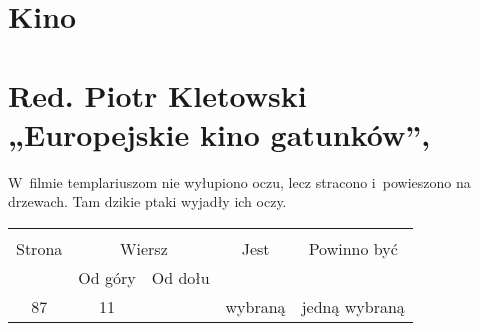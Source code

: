 \documentclass[a4paper,11pt]{article}
\numberwithin{equation}{section}
\begin{document}





























\newpage

\section{Kino}

\VerSpaceTwo



\section{ %
  Red. Piotr Kletowski \\
  „Europejskie kino gatunków”,
  \cite{RedKletowskiEuropejskieKinoGatunkow2016}}




 W~filmie templariuszom nie wyłupiono oczu, lecz
stracono i~powieszono na drzewach. Tam dzikie ptaki wyjadły ich oczy.







\begin{center}

  \begin{tabular}{|c|c|c|c|c|}
    \hline
    & \multicolumn{2}{c|}{} & & \\
    Strona & \multicolumn{2}{c|}{Wiersz} & Jest
                              & Powinno być \\ \cline{2-3}
    & Od góry & Od dołu & & \\
    \hline
    87 & 11 & & wybraną & jedną wybraną \\
    \hline
  \end{tabular}

\end{center}
\end{document}
